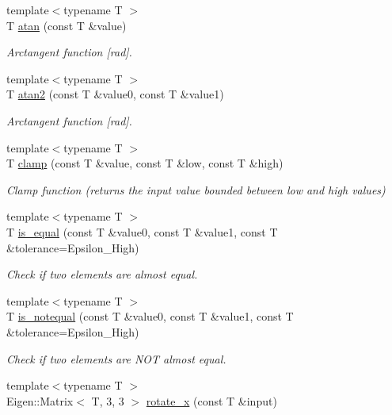 \begin{DoxyCompactItemize}
{\footnotesize template$<$typename T $>$ }\\T \hyperlink{namespaceddd_a750f7cad6893bbbfbaa51353044bde4f}{atan} (const T \&value)
\begin{DoxyCompactList}\small\item\em Arctangent function \mbox{[}rad\mbox{]}. \end{DoxyCompactList}\item 
{\footnotesize template$<$typename T $>$ }\\T \hyperlink{namespaceddd_a1dea631509d981c3718796774b796d6c}{atan2} (const T \&value0, const T \&value1)
\begin{DoxyCompactList}\small\item\em Arctangent function \mbox{[}rad\mbox{]}. \end{DoxyCompactList}\item 
{\footnotesize template$<$typename T $>$ }\\T \hyperlink{namespaceddd_a070060e53a22cb16f07576bfb5c4b1cc}{clamp} (const T \&value, const T \&low, const T \&high)
\begin{DoxyCompactList}\small\item\em Clamp function (returns the input value bounded between low and high values) \end{DoxyCompactList}\item 
{\footnotesize template$<$typename T $>$ }\\T \hyperlink{namespaceddd_a7d68733d32a94776596a8e213ae9fcdf}{is\+\_\+equal} (const T \&value0, const T \&value1, const T \&tolerance=Epsilon\+\_\+\+High)
\begin{DoxyCompactList}\small\item\em Check if two elements are almost equal. \end{DoxyCompactList}\item 
{\footnotesize template$<$typename T $>$ }\\T \hyperlink{namespaceddd_a9b12e82fa10b6beadb08360007e6b57b}{is\+\_\+notequal} (const T \&value0, const T \&value1, const T \&tolerance=Epsilon\+\_\+\+High)
\begin{DoxyCompactList}\small\item\em Check if two elements are N\+OT almost equal. \end{DoxyCompactList}\item 
{\footnotesize template$<$typename T $>$ }\\Eigen\+::\+Matrix$<$ T, 3, 3 $>$ \hyperlink{namespaceddd_ad45c0a592c1aebe03fc48a0c57d52641}{rotate\+\_\+x} (const T \&input)

\end{DoxyCompactItemize}
